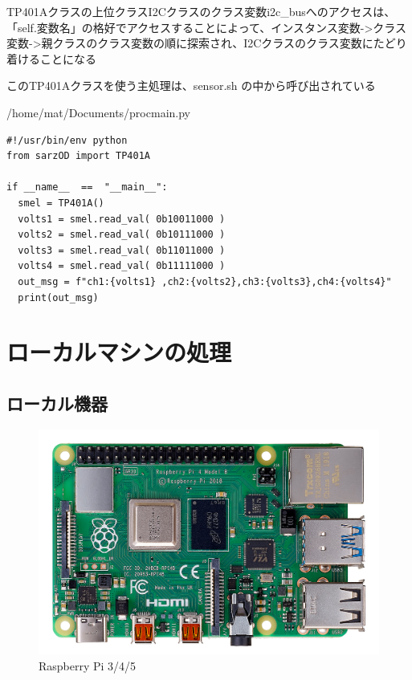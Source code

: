 \documentclass[12pt,a4j]{jsbook}
\begin{document}
TP401Aクラスの上位クラスI2Cクラスのクラス変数i2c\_busへのアクセスは、「self.変数名」の格好でアクセスすることによって、インスタンス変数->クラス変数->親クラスのクラス変数の順に探索され、I2Cクラスのクラス変数にたどり着けることになる

このTP401Aクラスを使う主処理は、sensor.sh の中から呼び出されている

\begin{spacing}{0.85}
\begin{itembox}[l]{/home/mat/Documents/procmain.py}
\begin{verbatim}
#!/usr/bin/env python
from sarzOD import TP401A

if __name__  ==  "__main__":
  smel = TP401A()
  volts1 = smel.read_val( 0b10011000 )
  volts2 = smel.read_val( 0b10111000 )
  volts3 = smel.read_val( 0b11011000 )
  volts4 = smel.read_val( 0b11111000 )
  out_msg = f"ch1:{volts1} ,ch2:{volts2},ch3:{volts3},ch4:{volts4}"
  print(out_msg)
\end{verbatim}
\end{itembox}
\end{spacing}

\section{ローカルマシンの処理}

\subsection{ローカル機器}

\begin{figure}[H]
	\begin{minipage}[b]{1.0\linewidth}
		\centering
		\includegraphics[keepaspectratio, scale=0.12]{figs/jpg/udrp4b_front.jpg}
		\caption{Raspberry Pi 3/4/5}
	\end{minipage}
\end{figure}
\end{document}
